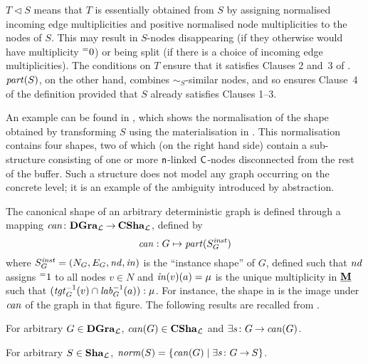 %
$T\triangleleft S$ means that $T$ is essentially obtained from $S$ by assigning
normalised incoming edge multiplicities and positive normalised node
multiplicities to the nodes of $S$. This may result in $S$-nodes disappearing
(if they otherwise would have multiplicity ${{}^{=}{0}}$) or being split (if there is
a choice of incoming edge multiplicities). The conditions on $T$ ensure that it
satisfies Clauses 2 and~3 of . $\mathit{part}(S)$, on the other
hand, combines $\sim_S$-similar nodes, and so ensures Clause~4 of the
definition provided that $S$ already satisfies Clauses 1--3.

An example can be found in , which shows the normalisation of
the shape obtained by transforming $S$ using the materialisation in
. This normalisation contains four shapes, two of which (on
the right hand side) contain a sub-structure consisting of one or more
${\mathsf{n}}$-linked ${\mathsf{C}}$-nodes disconnected from the rest of the buffer. Such a
structure does not model any graph occurring on the concrete level; it is an
example of the ambiguity introduced by abstraction.

%
%
The canonical shape of an arbitrary deterministic graph is
defined through a mapping $\mathit{can}\colon {\mathbf{DGra}_{\cal L}} \mathbin{\rightarrow} {\mathbf{CSha}_{\cal L}}$, defined by
%
\begin{equation}\eqlabel{canon}
\GCanon: G \mapsto \partition(S^\ic_G)
\end{equation}
%
where $S^{\mathit{inst}}_G=(N_G, E_G, \mathit{nd}, \mathit{in})$ is the ``instance shape'' of
$G$, defined such that $\mathit{nd}$ assigns ${{}^{=}{1}}$ to all nodes $v\in N$ and
$\mathit{in}(v)(a)=\mu$ is the unique multiplicity in $\underline{\mathbf{M}}$ such that
$(\mathit{tgt}^{-1}_G(v)\cap \mathit{lab}^{-1}_G(a)):\mu$. For instance, the shape in
 is the image under $\mathit{can}$ of the graph in that figure. The
following results are recalled from \cite{Rens04-avis}.

\begin{theorem}
For arbitrary $G\in \mathbf{DGra}_{\cal L}$, $\mathit{can}(G)\in \mathbf{CSha}_{\cal L}$ and 
$\exists s\colon {G} \mathbin{\rightarrow} {\mathit{can}}(G)$.
\end{theorem}

\begin{theorem}
  For arbitrary $S\in \mathbf{Sha}_{\cal L}$, $\mathit{norm}(S)={\textstyle\mathopen\{ \mathit{can}(G) \mid \exists
  s\colon {G} \mathbin{\rightarrow} {S} \mathclose\}}$.
\end{theorem}

